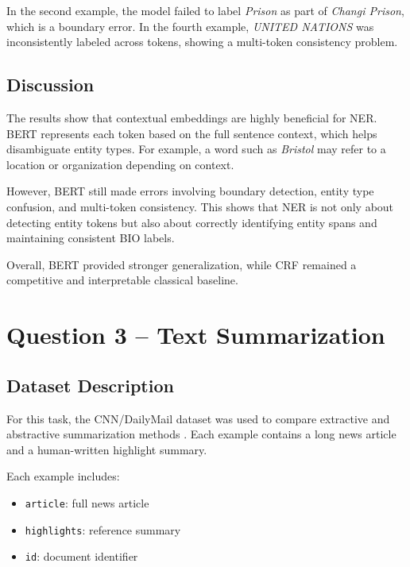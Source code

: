 \documentclass[11pt,a4paper]{article}
\begin{document}
In the second example, the model failed to label \textit{Prison} as part of \textit{Changi Prison}, which is a boundary error. In the fourth example, \textit{UNITED NATIONS} was inconsistently labeled across tokens, showing a multi-token consistency problem.

\subsection{Discussion}

The results show that contextual embeddings are highly beneficial for NER. BERT represents each token based on the full sentence context, which helps disambiguate entity types. For example, a word such as \textit{Bristol} may refer to a location or organization depending on context.

However, BERT still made errors involving boundary detection, entity type confusion, and multi-token consistency. This shows that NER is not only about detecting entity tokens but also about correctly identifying entity spans and maintaining consistent BIO labels.

Overall, BERT provided stronger generalization, while CRF remained a competitive and interpretable classical baseline.

\section{Question 3 -- Text Summarization}

\subsection{Dataset Description}

For this task, the CNN/DailyMail dataset was used to compare extractive and abstractive summarization methods \cite{see2017get}. Each example contains a long news article and a human-written highlight summary.

Each example includes:

\begin{itemize}[leftmargin=*]
    \item \texttt{article}: full news article
    \item \texttt{highlights}: reference summary
    \item \texttt{id}: document identifier
\end{itemize}
\end{document}
